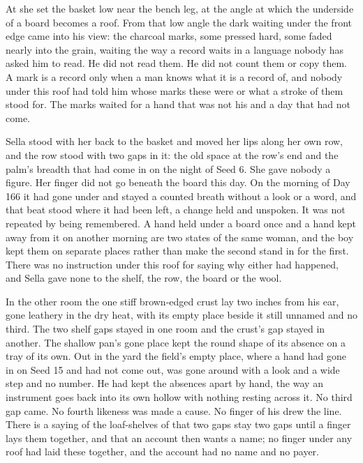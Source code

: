 \scenebreak

At  she set the basket low near the bench leg, at the angle at which the underside of a board becomes a roof. From that low angle the dark waiting under the front edge came into his view: the charcoal marks, some pressed hard, some faded nearly into the grain, waiting the way a record waits in a language nobody has asked him to read. He did not read them. He did not count them or copy them. A mark is a record only when a man knows what it is a record of, and nobody under this roof had told him whose marks these were or what a stroke of them stood for. The marks waited for a hand that was not his and a day that had not come.

Sella stood with her back to the basket and moved her lips along her own row, and the row stood with two gaps in it: the old space at the row's end and the palm's breadth that had come in on the night of Seed 6. She gave nobody a figure. Her finger did not go beneath the board this day. On the morning of Day 166 it had gone under and stayed a counted breath without a look or a word, and that beat stood where it had been left, a change held and unspoken. It was not repeated by being remembered. A hand held under a board once and a hand kept away from it on another morning are two states of the same woman, and the boy kept them on separate places rather than make the second stand in for the first. There was no instruction under this roof for saying why either had happened, and Sella gave none to the shelf, the row, the board or the wool.

In the other room the one stiff brown-edged crust lay two inches from his ear, gone leathery in the dry heat, with its empty place beside it still unnamed and no third. The two shelf gaps stayed in one room and the crust's gap stayed in another. The shallow pan's gone place kept the round shape of its absence on a tray of its own. Out in the yard the field's empty place, where a hand had gone in on Seed 15 and had not come out, was gone around with a look and a wide step and no number. He had kept the absences apart by hand, the way an instrument goes back into its own hollow with nothing resting across it. No third gap came. No fourth likeness was made a cause. No finger of his drew the line. There is a saying of the loaf-shelves of  that two gaps stay two gaps until a finger lays them together, and that an account then wants a name; no finger under any roof had laid these together, and the account had no name and no payer.

